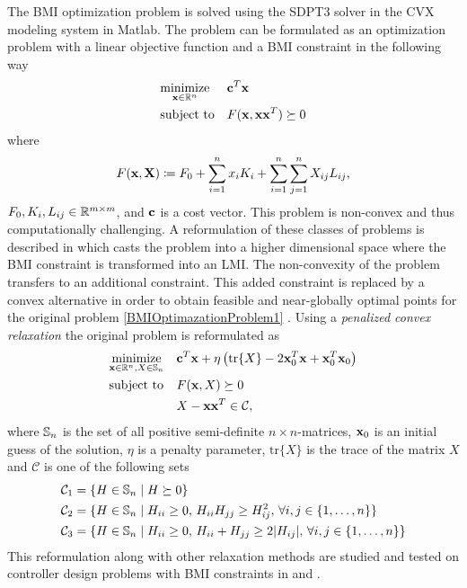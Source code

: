 \documentclass[a4paper,12pt,twoside,BCOR=10mm]{scrbook}
\begin{document}
The BMI optimization problem is solved using the SDPT3 solver in the CVX modeling system in Matlab. The problem can be formulated as an optimization problem with a linear objective function and a BMI constraint in the following way
\begin{align}\label{BMIOptimazationProblem1}
    \begin{aligned}
    & \underset{\mathbf{x}\in \mathbb{R}^{n}}{\text{minimize}} & & \mathbf{c}^T\mathbf{x}\\
    & \text{subject to} & & F(\mathbf{x},\mathbf{x}\mathbf{x}^T) \succeq 0
    \end{aligned}
\end{align}
where
\begin{align*}
    F(\mathbf{x}, \mathbf{X}) \coloneqq F_0 + \sum_{i = 1}^nx_iK_i + \sum_{i = 1}^n\sum_{j = 1}^n X_{ij}L_{ij},
\end{align*}
$F_0, K_i,L_{ij} \in \mathbb{R}^{m\times m}$, and $\mathbf{c}$ is a cost vector. This problem is non-convex and thus computationally challenging. A reformulation of these classes of problems is described in \citep{KZM2018BMI1} which casts the problem into a higher dimensional space where the BMI constraint is transformed into an LMI. The non-convexity of the problem transfers to an additional constraint. This added constraint is replaced by a convex alternative in order to obtain feasible and near-globally optimal points for the original problem \eqref{BMIOptimazationProblem1} \citep{KZM2018BMI1}. Using a \textit{penalized convex relaxation} the original problem is reformulated as
\begin{align}
    \begin{aligned}
    & \underset{\mathbf{x} \in \mathbb{R}^{n}, X \in \mathbb{S}_n}{\text{minimize}} & & \mathbf{c}^T\mathbf{x} + \eta\left(\text{tr}\{X\} - 2\mathbf{x}_0^T\mathbf{x} + \mathbf{x}_0^T\mathbf{x}_0\right)\\
    & \text{subject to} & & F(\mathbf{x}, X) \succeq 0\\
    & & & X - \mathbf{x}\mathbf{x}^T \in \mathcal{C},
    \end{aligned}
\end{align}
where $\mathbb{S}_n$ is the set of all positive semi-definite $n \times n$-matrices, $\mathbf{x}_0$ is an initial guess of the solution, $\eta$ is a penalty parameter, $\text{tr}\{X\}$ is the trace of the matrix $X$ and $\mathcal{C}$ is one of the following sets
\begin{align*}
    &\mathcal{C}_1 = \{H\in \mathbb{S}_n \mid H\succeq 0\}\\
    &\mathcal{C}_2 = \{H\in \mathbb{S}_n \mid H_{ii} \geq 0,\, H_{ii}H_{jj} \geq H_{ij}^2, \, \forall i,j\in\{1,\ldots, n\}\}\\
    &\mathcal{C}_3 = \{H\in\mathbb{S}_n \mid H_{ii} \geq 0, \, H_{ii} + H_{jj} \geq 2|H_{ij}|,\, \forall i,j\in\{1,\ldots, n\}\}
\end{align*}
This reformulation along with other relaxation methods are studied and tested on controller design problems with BMI constraints in \citep{KZM2018BMI1} and \citep{KZM2018BMI2}.
\end{document}
